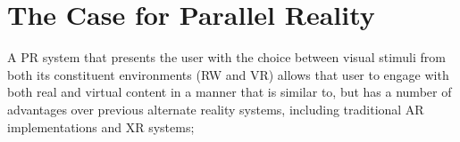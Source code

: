







\section{The Case for Parallel Reality}
\label{caseforpr}

A PR system that presents the user with the choice between visual stimuli from both its constituent environments (RW and VR) allows that user to engage with both real and virtual content in a manner that is similar to, but has a number of advantages over previous alternate reality systems, including traditional AR implementations and XR systems;

